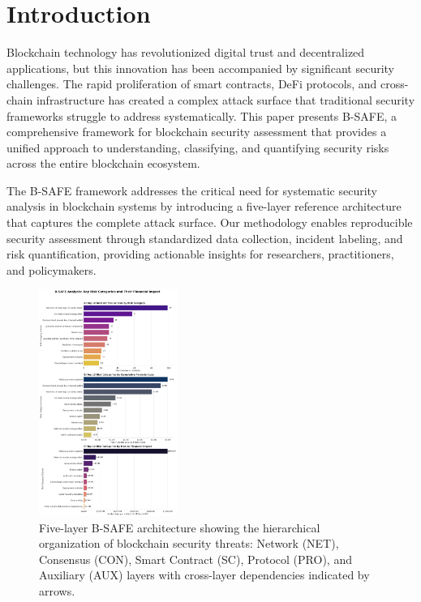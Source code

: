 \section{Introduction}
Blockchain technology has revolutionized digital trust and decentralized applications, but this innovation has been accompanied by significant security challenges. The rapid proliferation of smart contracts, DeFi protocols, and cross-chain infrastructure has created a complex attack surface that traditional security frameworks struggle to address systematically. This paper presents B-SAFE, a comprehensive framework for blockchain security assessment that provides a unified approach to understanding, classifying, and quantifying security risks across the entire blockchain ecosystem.

The B-SAFE framework addresses the critical need for systematic security analysis in blockchain systems by introducing a five-layer reference architecture that captures the complete attack surface. Our methodology enables reproducible security assessment through standardized data collection, incident labeling, and risk quantification, providing actionable insights for researchers, practitioners, and policymakers.

\begin{figure}[H]
\centering
\includegraphics[width=0.4\textwidth]{../figure/fig1.png}
\caption{Five-layer B-SAFE architecture showing the hierarchical organization of blockchain security threats: Network (NET), Consensus (CON), Smart Contract (SC), Protocol (PRO), and Auxiliary (AUX) layers with cross-layer dependencies indicated by arrows.}
\label{fig:five_layer_architecture}
\end{figure}